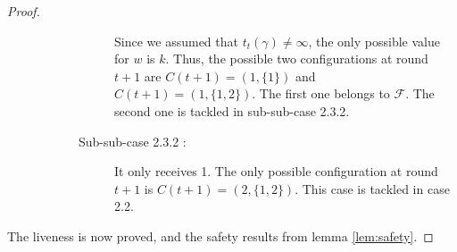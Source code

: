 \documentclass{article}
\newcommand{\cent}{\gamma}
\newcommand{\try}{t_{t}}
\begin{document}
\begin{proof}
\begin{description}
\begin{description}
\begin{description}
							Since we assumed that $\try(\cent) \neq \infty$, the only possible value for $w$ is $k$.
							Thus, the possible two configurations at round $t+1$ are $C(t+1) = (1, \{1\})$ and $C(t+1) = (1, \{1, 2\})$.
							The first one belongs to $\mathcal{F}$. The second one is tackled in sub-sub-case 2.3.2.
						\item[Sub-sub-case 2.3.2 : ] It only receives 1.
							The only possible configuration at round $t+1$ is $C(t+1) = (2, \{1, 2\})$.
							This case is tackled in case 2.2.
					\end{description}
			\end{description}
	\end{description}
	The liveness is now proved, and the safety results from lemma \ref{lem:safety}.
\end{proof}

\printbibliography
\end{document}
